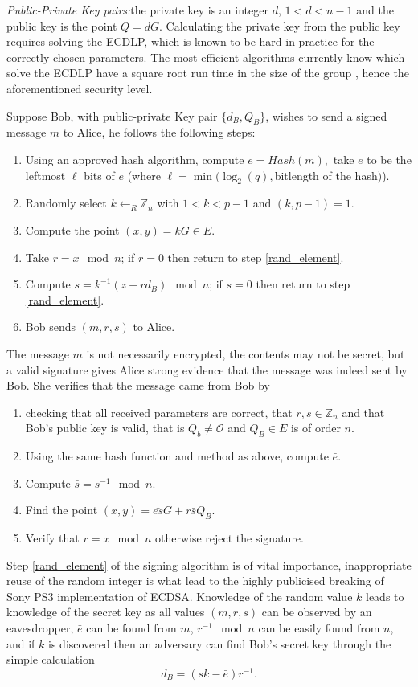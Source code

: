 \documentclass{llncs}
\newcommand{\Z}{{\mathbb Z}}
\begin{document}
\emph{Public-Private Key pairs:}\quad the private key is an integer $d$, $1<d<n-1$ and the public key is the point $Q=dG$. Calculating the private key from the public key requires solving the ECDLP, which is known to be hard in practice for the correctly chosen parameters. The most efficient algorithms currently know which solve the ECDLP have a square root run time in the size of the group \cite{WienerZ98,GallantLV00}, hence the aforementioned security level.
\vspace{0.5cm}

Suppose Bob, with public-private Key pair $\{d_B,Q_B\}$, wishes to send a signed message $m$ to Alice, he follows the following steps:
\begin{enumerate}
\item Using an approved hash algorithm, compute $e=Hash(m),$ take $\bar{e}$ to be the leftmost $\ell$ bits of $e$ (where $\ell=\min(\log_2(q),$bitlength of the hash$)$). 
\item\label{rand_element} Randomly select $k\leftarrow_R\Z_n$ with $1<k<p-1$ and $(k,p-1)=1$.
\item\label{scalar_mult} Compute the point $(x,y)=kG\in E$. 
\item Take $r=x\mod n$; if $r=0$ then return to step \ref{rand_element}.
\item Compute $s=k^{-1}(z+rd_B)\mod n$; if $s=0$ then return to step \ref{rand_element}.
\item Bob sends $(m,r,s)$ to Alice.
\end{enumerate}
The message $m$ is not necessarily encrypted, the contents may not be secret, but a valid signature gives Alice strong evidence that the message was indeed sent by Bob. She verifies that the message came from Bob by 

\begin{enumerate}
\item checking that all received parameters are correct, that $r,s\in\Z_n$ and that Bob's public key is valid, that is $Q_b\neq \mathcal{O}$ and $Q_B\in E$ is of order $n$.
\item Using the same hash function and method as above, compute $\bar{e}$.
\item Compute $\bar{s}=s^{-1}\mod n$.
\item Find the point $(x,y)=\bar{es}G+r\bar{s}Q_B$.
\item Verify that $r=x\mod n$ otherwise reject the signature.
\end{enumerate}

Step \ref{rand_element} of the signing algorithm is of vital importance, inappropriate reuse of the random integer is what lead to the highly publicised breaking of Sony PS3 implementation of ECDSA. Knowledge of the random value $k$ leads to knowledge of the secret key as all values $(m,r,s)$ can be observed by an eavesdropper, $\bar{e}$ can be found from $m$, $r^{-1}\mod n$ can be easily found from $n$, and if $k$ is discovered then an adversary can find Bob's secret key through the simple calculation $$d_B=(sk-\bar{e})r^{-1}.$$
\end{document}
